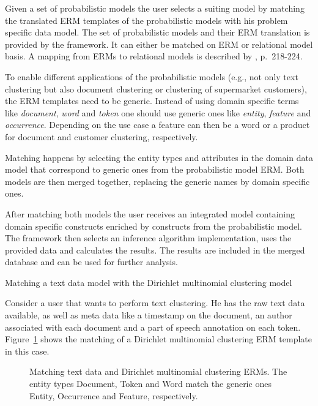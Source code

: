 Given a set of probabilistic models the user selects a suiting model by matching the translated ERM templates of the probabilistic models with his problem specific data model. The set of probabilistic models and their ERM translation is provided by the framework. It can either be matched on ERM or relational model basis. A mapping from ERMs to relational models is described by \textcite{elmasri2007database}, p.~218-224.

To enable different applications of the probabilistic models (e.g., not only text clustering but also document clustering or clustering of supermarket customers), the ERM templates need to be generic. Instead of using domain specific terms like \emph{document}, \emph{word} and \emph{token} one should use generic ones like \emph{entity}, \emph{feature} and \emph{occurrence}. Depending on the use case a feature can then be a word or a product for document and customer clustering, respectively.

Matching happens by selecting the entity types and attributes in the domain data model that correspond to generic ones from the probabilistic model ERM. Both models are then merged together, replacing the generic names by domain specific ones.

After matching both models the user receives an integrated model containing domain specific constructs enriched by constructs from the probabilistic model. The framework then selects an inference algorithm implementation, uses the provided data and calculates the results. The results are included in the merged database and can be used for further analysis.

\begin{Example} Matching a text data model with the Dirichlet multinomial clustering model

Consider a user that wants to perform text clustering. He has the raw text data available, as well as meta data like a timestamp on the document, an author associated with each document and a part of speech annotation on each token. Figure~\ref{fig:matching_clustering} shows the matching of a Dirichlet multinomial clustering ERM template in this case.

\vspace*{1em}
\begin{figure}[h!]
\centering
\scalebox{0.5}{\adjustTikzSize }
\caption[Matching text data and Dirichlet multinomial clustering ERM]{Matching text data and Dirichlet multinomial clustering ERMs. The entity types Document, Token and Word match the generic ones Entity, Occurrence and Feature, respectively.}\label{fig:matching_clustering}
\end{figure}

\end{Example}
